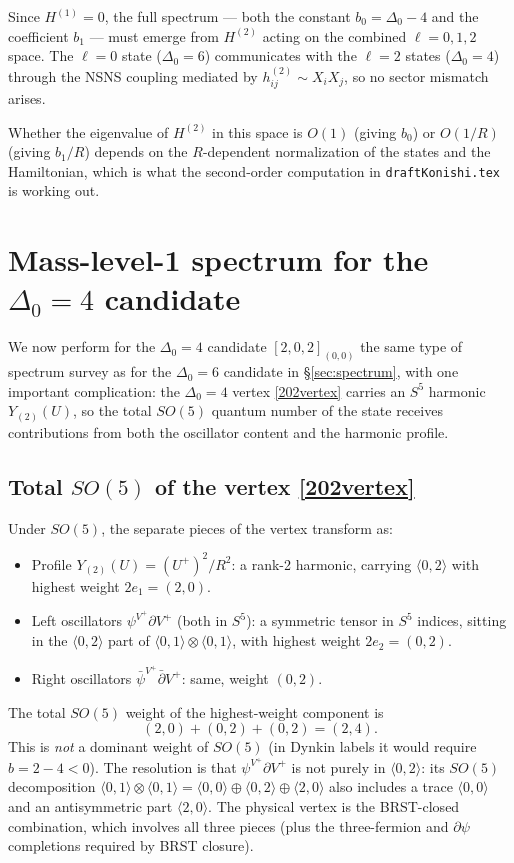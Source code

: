 \documentclass[12pt]{article}
\def\be{\begin{equation}}
\def\ee{\end{equation}}
\newcommand{\D}{\ensuremath{\Delta}}
\begin{document}
Since $H^{(1)}=0$, the full spectrum --- both the constant $b_0=\D_0-4$ and the coefficient
$b_1$ --- must emerge from $H^{(2)}$ acting on the combined $\ell=0,1,2$ space.
The $\ell=0$ state ($\D_0=6$) communicates with the $\ell=2$ states ($\D_0=4$) through
the NSNS coupling mediated by $h^{(2)}_{ij}\sim X_iX_j$, so no sector mismatch arises.

Whether the eigenvalue of $H^{(2)}$ in this space is $O(1)$ (giving $b_0$) or
$O(1/R)$ (giving $b_1/R$) depends on the $R$-dependent normalization of the states
and the Hamiltonian, which is what the second-order computation in \texttt{draftKonishi.tex}
is working out.

\section{Mass-level-1 spectrum for the \texorpdfstring{$\D_0=4$}{Delta0=4} candidate}
\label{sec:delta4_spectrum}

We now perform for the $\D_0=4$ candidate $[2,0,2]_{(0,0)}$ the same type of spectrum
survey as for the $\D_0=6$ candidate in \S\ref{sec:spectrum}, with one important
complication: the $\D_0=4$ vertex \eqref{202vertex} carries an $S^5$ harmonic $Y_{(2)}(U)$,
so the total $SO(5)$ quantum number of the state receives contributions from both the
oscillator content and the harmonic profile.

\subsection{Total \texorpdfstring{$SO(5)$}{SO(5)} of the vertex \eqref{202vertex}}

Under $SO(5)$, the separate pieces of the vertex transform as:
\begin{itemize}
\item Profile $Y_{(2)}(U)=(U^+)^2/R^2$: a rank-2 harmonic, carrying
$\langle 0,2\rangle$ with highest weight $2e_1=(2,0)$.
\item Left oscillators $\psi^{V^+}\partial V^+$ (both in $S^5$): a symmetric tensor in $S^5$
indices, sitting in the $\langle 0,2\rangle$ part of $\langle 0,1\rangle\otimes\langle 0,1\rangle$,
with highest weight $2e_2=(0,2)$.
\item Right oscillators $\bar\psi^{V^+}\bar\partial V^+$: same, weight $(0,2)$.
\end{itemize}
The total $SO(5)$ weight of the highest-weight component is
\be
(2,0)+(0,2)+(0,2)=(2,4).
\ee
This is \emph{not} a dominant weight of $SO(5)$ (in Dynkin labels it
would require $b=2-4<0$). The resolution is that $\psi^{V^+}\partial V^+$
is not purely in $\langle 0,2\rangle$: its $SO(5)$ decomposition
$\langle 0,1\rangle\otimes\langle 0,1\rangle=\langle 0,0\rangle\oplus\langle 0,2\rangle\oplus\langle 2,0\rangle$
also includes a trace $\langle 0,0\rangle$ and an antisymmetric part $\langle 2,0\rangle$.
The physical vertex is the BRST-closed combination, which involves all three pieces
(plus the three-fermion and $\partial\psi$ completions required by BRST closure).
\end{document}
